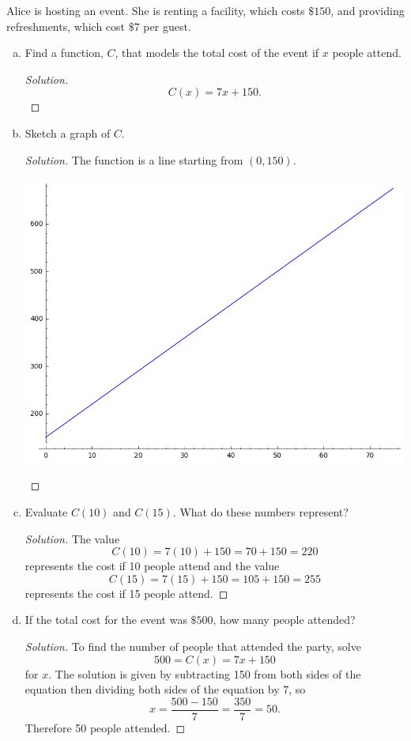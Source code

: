 \documentclass[12pt]{amsart}
\begin{document}
\begin{thm}[16 Points]\label{ex7}
  Alice is hosting an event.  She is renting a facility, which costs $\$150$, and providing refreshments, which cost $\$7$ per guest.
  \begin{enumerate}[(a)]
  \item
    Find a function, $C$, that models the total cost of the event if $x$ people attend.
    \begin{proof}[Solution]
      \[C(x) = 7x + 150.\]
    \end{proof}
  \item
    Sketch a graph of $C$.
    \begin{proof}[Solution]
      The function is a line starting from \((0,150)\).
      \begin{center}
        \includegraphics[scale=0.5]{plot.png}
      \end{center}
    \end{proof}
  \item
    Evaluate $C(10)$ and $C(15)$.  What do these numbers represent?
    \begin{proof}[Solution]
      The value
      \[C(10) = 7(10) + 150 = 70 + 150 = 220\]
      represents the cost if 10 people attend and the value
      \[C(15) = 7(15) + 150 = 105 + 150 = 255\]
      represents the cost if 15 people attend.
    \end{proof}
  \item
    If the total cost for the event was $\$500$, how many people attended?
    \begin{proof}[Solution]
      To find the number of people that attended the party, solve
      \[500 = C(x) = 7x + 150\]
      for $x$.
      The solution is given by subtracting 150 from both sides of the equation then dividing both sides of the equation by 7, so
      \[x = \frac{500 - 150}{7} = \frac{350}{7} = 50.\]
      Therefore 50 people attended.
    \end{proof}
  \end{enumerate}
\end{thm}
\end{document}
